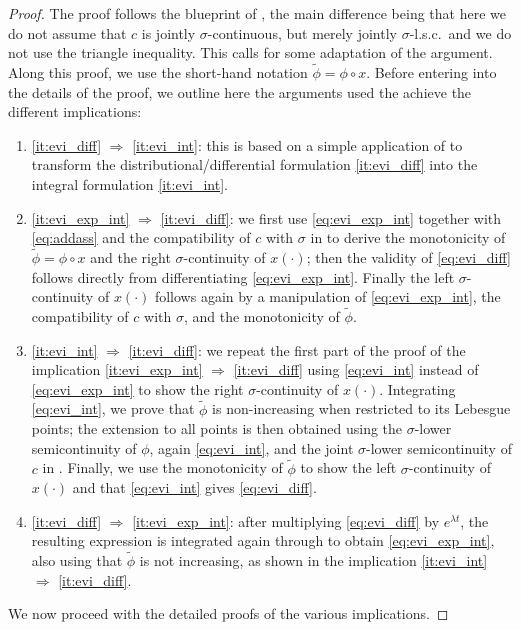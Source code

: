 \documentclass[reqno]{amsart}
\theoremstyle{plain}
\theoremstyle{remark}
\theoremstyle{plain}
\numberwithin{equation}{section}
\theoremstyle{remark}
\begin{document}
\begin{proof} The proof  follows the blueprint of  
\cite[Theorem 3.3]{MuratoriSavare}, the main difference being that here we do not assume that $c$ is  jointly $\sigma$-continuous, but merely   jointly  
$\sigma$-l.s.c.\ and we do not use the triangle inequality. This calls for some adaptation of the argument. Along this proof, we use the short-hand notation $\tilde \phi = \phi \circ x$. Before entering  into   the details of the proof, we outline here the arguments used the achieve the different implications:
\begin{enumerate}
    \item \ref{it:evi_diff} $\Rightarrow$ \ref{it:evi_int}: this is based on a simple application of \cite[Lemma A.1]{MuratoriSavare} to transform the distributional/differential  formulation  \ref{it:evi_diff} into the integral   formulation  \ref{it:evi_int}.
    \item \ref{it:evi_exp_int} $\Rightarrow$ \ref{it:evi_diff}: we first use \eqref{eq:evi_exp_int} together with \eqref{eq:addass} and the compatibility of $c$ with $\sigma$ in  to derive the monotonicity of $\tilde \phi = \phi \circ x  $ and the right $\sigma$-continuity of $x(\cdot)$; then the validity of \eqref{eq:evi_diff} follows directly from differentiating \eqref{eq:evi_exp_int}. Finally the left $\sigma$-continuity of $x(\cdot)$ follows again by a manipulation of \eqref{eq:evi_exp_int}, the compatibility of $c$ with $\sigma$, and the monotonicity of $\tilde \phi$.
    \item \ref{it:evi_int} $\Rightarrow$ \ref{it:evi_diff}: we repeat the first part of the proof of the implication \ref{it:evi_exp_int} $\Rightarrow$ \ref{it:evi_diff} using \eqref{eq:evi_int} instead of \eqref{eq:evi_exp_int} to show the right $\sigma$-continuity of $x(\cdot)$. Integrating \eqref{eq:evi_int}, we prove that $\tilde \phi$ is non-increasing when restricted to its Lebesgue points; the extension to all points is then obtained using the $\sigma$-lower semicontinuity of $\phi$, again \eqref{eq:evi_int}, and the joint $\sigma$-lower semicontinuity of $c$ in . Finally, we use the monotonicity of $\tilde \phi$ to show the left $\sigma$-continuity of $x(\cdot)$ and that \eqref{eq:evi_int} gives \eqref{eq:evi_diff}.
    \item \ref{it:evi_diff} $\Rightarrow$ \ref{it:evi_exp_int}: after multiplying \eqref{eq:evi_diff} by $e^{\lambda t}$, the resulting expression is integrated again through \cite[Lemma A.1]{MuratoriSavare} to obtain \eqref{eq:evi_exp_int}, also using that $\tilde \phi$ is not increasing, as shown in the implication \ref{it:evi_int} $\Rightarrow$ \ref{it:evi_diff}.
\end{enumerate}
We now proceed with the detailed proofs of the various implications.



\end{proof}
\end{document}
